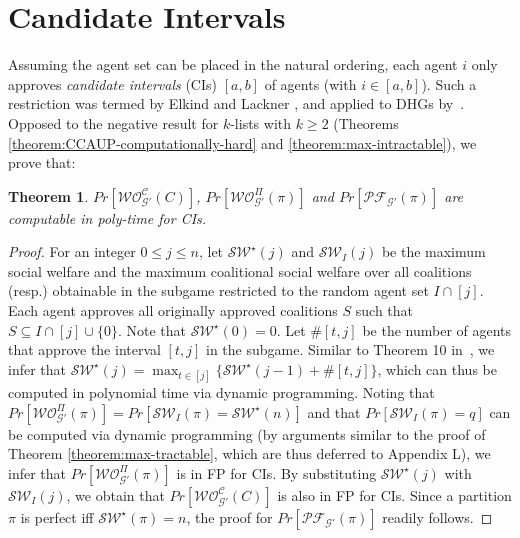 \documentclass[letterpaper]{article}
\newtheorem{theorem}{Theorem}
\begin{document}
\section{Candidate Intervals}
\label{sec:Candidate Intervals}
Assuming the agent set can be placed in the natural ordering, each agent $i$ only approves \textit{candidate intervals} (CIs) $[a, b]$ of agents (with $i \in [a, b]$). Such a restriction was termed by Elkind and Lackner , and applied to DHGs by~\cite{peters2016complexity}. %
Opposed to the negative result for $k$-lists with $k \geq 2$ (Theorems \ref{theorem:CCAUP-computationally-hard} and \ref{theorem:max-intractable}), we prove that:
\begin{theorem}
\label{theorem:CI-max-sw}
$Pr[\mathcal{WO}^{\mathcal{C}}_{\mathcal{G}'}(C)]$, $Pr[\mathcal{WO}_{\mathcal{G}'}^{\Pi}(\pi)]$ and $Pr[\mathcal{PF}_{\mathcal{G}'}(\pi)]$ are computable in poly-time for CIs.
\end{theorem}
\begin{proof}
For an integer $0 \leq j \leq n$, let $\mathcal{SW}^\star(j)$ and $\mathcal{SW}_I(j)$ be the maximum social welfare and the maximum coalitional social welfare over all coalitions (resp.) obtainable in the subgame restricted to the random agent set $I \cap [j]$. Each agent approves all originally approved coalitions $S$ such that $S \subseteq I \cap [j] \cup \{0\}$. Note that $\mathcal{SW}^\star(0) = 0$. Let $\#[t,j]$ be the number of agents that approve the interval $[t, j]$ in the subgame. Similar to Theorem 10 in~\cite{peters2016complexity}, we infer that $\mathcal{SW}^\star(j) = \max_{t \in [j]} \{\mathcal{SW}^\star(j-1) + \#[t,j]\}$, which can thus be computed in polynomial time via dynamic programming. Noting that $Pr[\mathcal{WO}_{\mathcal{G}'}^{\Pi}(\pi)] = Pr[\mathcal{SW}_I(\pi) = \mathcal{SW}^\star(n)]$ and that $Pr[\mathcal{SW}_I(\pi) = q]$ can be computed via dynamic programming (by arguments similar to the proof of Theorem \ref{theorem:max-tractable}, which are thus deferred to Appendix L), we infer that $Pr[\mathcal{WO}_{\mathcal{G}'}^{\Pi}(\pi)]$ is in FP for CIs. By substituting $\mathcal{SW}^\star(j)$ with $\mathcal{SW}_I(j)$, we obtain that $Pr[\mathcal{WO}^{\mathcal{C}}_{\mathcal{G}'}(C)]$ is also in FP for CIs. Since a partition $\pi$ is perfect iff $\mathcal{SW}^\star(\pi) = n$, the proof for $Pr[\mathcal{PF}_{\mathcal{G}'}(\pi)]$ readily follows.
\end{proof}
\end{document}

